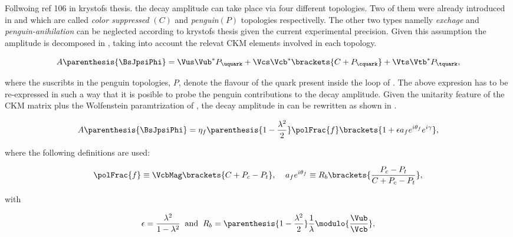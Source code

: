 


Follwoing {\color{red} ref 106 in krystofs thesis.} the \BsJpsiPhi decay amplitude can take place via four different topologies.
Two of them were already introduced in  and  which are called {\it color suppressed }$(C)$ and {\it penguin}$(P)$
topologies respectivelly. The other two types namelly {\it exchage} and {\it penguin-anihilation} can be neglected according to {\color{red} krystofs thesis}
given the current experimental precision. Given this assumption the \BsJpsiPhi amplitude is decomposed in , taking into account the
relevat CKM elements involved in each topology.

\begin{equation}
A \parenthesis{\BsJpsiPhi} = \Vus\Vub^*P_{\uquark} + \Vcs\Vcb^*\brackets{C +P_{\cquark}} + \Vts\Vtb^*P_{\tquark},
 \label{bsjpsiphi_amp}
\end{equation}

\noindent where the suscribts in the penguin topologies, $P$, denote the flavour of the quark present inside the loop of .
The above expresion  has to be re-expressed in such a way that it is posible to probe the penguin contributions to
the \BsJpsiPhi decay amplitude. Given the unitarity feature of the CKM matrix plus the Wolfenstein paramtrization of ,
the decay amplitude in  can be rewritten as shown in .

\begin{equation}
  A \parenthesis{\BsJpsiPhi} = \eta_f  \parenthesis{1-\frac{\lambda^2}{2}} \polFrac{f} \brackets{ 1 + \epsilon a_f e^{i\theta_f} e^{i\gamma} },
 \label{bsjpsiphi_amp_param}
\end{equation}

\noindent where the following definitions are used:

\begin{equation}
  \polFrac{f} \equiv \VcbMag \brackets{C + P_c - P_t}, \;\;\;\; a_f e^{i\theta_f} \equiv R_b \brackets{ \frac{P_c - P_t}{C + P_c - P_t} },
  \label{bsjpsiphi_amp_param_defs}
\end{equation}

\noindent with

\begin{equation}
  \epsilon = \frac{\lambda^2}{1-\lambda^2} \;\;\text{and} \;\;  R_b = \parenthesis{1-\frac{\lambda^2}{2}} \frac{1}{\lambda} \modulo{\frac{\Vub}{\Vcb}},
  \label{bsjpsiphi_amp_param_defs_II}
\end{equation}

